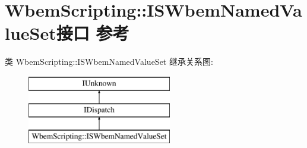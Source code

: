 \hypertarget{interface_wbem_scripting_1_1_i_s_wbem_named_value_set}{}\section{Wbem\+Scripting\+:\+:I\+S\+Wbem\+Named\+Value\+Set接口 参考}
\label{interface_wbem_scripting_1_1_i_s_wbem_named_value_set}
类 Wbem\+Scripting\+:\+:I\+S\+Wbem\+Named\+Value\+Set 继承关系图\+:\begin{figure}[H]
\begin{center}
\leavevmode
\includegraphics[height=3.000000cm]{interface_wbem_scripting_1_1_i_s_wbem_named_value_set}
\end{center}
\end{figure}

